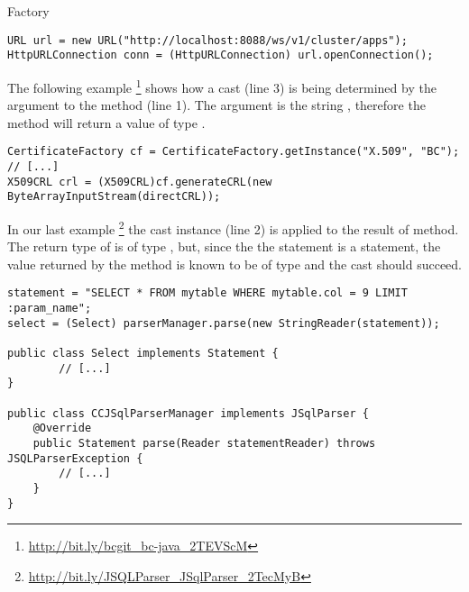 \begin{pattern}{Factory}
\begin{verbatim}
URL url = new URL("http://localhost:8088/ws/v1/cluster/apps");
HttpURLConnection conn = (HttpURLConnection) url.openConnection();
\end{verbatim}

The following example%
\footnote{\url{http://bit.ly/bcgit_bc-java_2TEVScM}}
shows how a cast (line 3) is being determined by the argument to the  method (line 1).
The argument is the string ,
therefore the method  will return a value of type .

\begin{verbatim}
CertificateFactory cf = CertificateFactory.getInstance("X.509", "BC");
// [...]
X509CRL crl = (X509CRL)cf.generateCRL(new ByteArrayInputStream(directCRL));
\end{verbatim}

In our last example%
\footnote{\url{http://bit.ly/JSQLParser_JSqlParser_2TecMyB}}
the cast instance (line 2) is applied to the result of  method.
The return type of  is of type , but,
since the 
the statement is a  statement,
the value returned by the  method is known to be of type 
and the cast should succeed.

\begin{verbatim}
statement = "SELECT * FROM mytable WHERE mytable.col = 9 LIMIT :param_name";
select = (Select) parserManager.parse(new StringReader(statement));

public class Select implements Statement {
        // [...]
}

public class CCJSqlParserManager implements JSqlParser {
    @Override
    public Statement parse(Reader statementReader) throws JSQLParserException {
        // [...]
    }
}
\end{verbatim}



\end{pattern}
